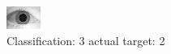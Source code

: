 \begin{figure}[h!]
\begin{center}
\includegraphics[width=0.60\columnwidth]{figures/ID1608_class_3_target_2.png}
\end{center}
\caption{ Classification: 3 actual target: 2}
\label{fig:ID1608_class_3_target_2}
\end{figure}
